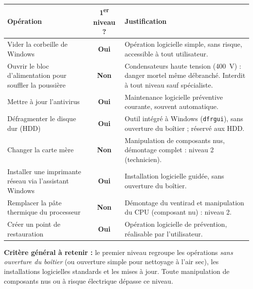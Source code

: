 \documentclass[11pt]{article}
\begin{document}
\begin{corrige}
\begin{center}
\begin{tabularx}{\linewidth}{|X|c|X|}
\hline
\rowcolor{popblueL}
\textbf{Opération} & \textbf{1\textsuperscript{er} niveau ?} & \textbf{Justification} \\
\hline
Vider la corbeille de Windows & \textbf{Oui} & Opération logicielle simple, sans risque, accessible à tout utilisateur. \\
\hline
Ouvrir le bloc d'alimentation pour souffler la poussière & \textbf{Non} & Condensateurs haute tension (400~V) : danger mortel même débranché. Interdit à tout niveau sauf spécialiste. \\
\hline
Mettre à jour l'antivirus & \textbf{Oui} & Maintenance logicielle préventive courante, souvent automatique. \\
\hline
Défragmenter le disque dur (HDD) & \textbf{Oui} & Outil intégré à Windows (\texttt{dfrgui}), sans ouverture du boîtier ; réservé aux HDD. \\
\hline
Changer la carte mère & \textbf{Non} & Manipulation de composants nus, démontage complet : niveau 2 (technicien). \\
\hline
Installer une imprimante réseau via l'assistant Windows & \textbf{Oui} & Installation logicielle guidée, sans ouverture du boîtier. \\
\hline
Remplacer la pâte thermique du processeur & \textbf{Non} & Démontage du ventirad et manipulation du CPU (composant nu) : niveau 2. \\
\hline
Créer un point de restauration & \textbf{Oui} & Opération logicielle de prévention, réalisable par l'utilisateur. \\
\hline
\end{tabularx}
\end{center}

\textbf{Critère général à retenir :} le premier niveau regroupe les opérations \emph{sans ouverture du boîtier} (ou ouverture simple pour nettoyage à l'air sec), les installations logicielles standards et les mises à jour. Toute manipulation de composants nus ou à risque électrique dépasse ce niveau.
\end{corrige}
\end{document}
